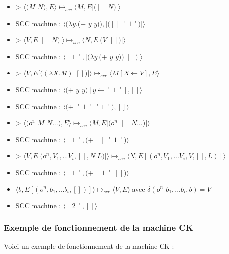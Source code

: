 \documentclass[10pt,a4paper]{article}
\begin{document}
\begin{itemize}
						\item[] > $\langle(M$ $N),E\rangle \longmapsto_{scc} \langle M,E[([]$ $N)]\rangle$
						\item[] SCC machine : $\langle(\lambda y.(+$ $y$ $y)),[([]$ $\ulcorner 1\urcorner)]\rangle$
						\item[] >  $\langle V,E[[]$ $N)]\rangle \longmapsto_{scc} \langle N,E[(V$ $[])]\rangle$
						\item[] SCC machine : $\langle\ulcorner 1\urcorner,[(\lambda y.(+$ $y$ $y))$ $[])]\rangle$
						\item[] > $\langle V,E[((\lambda X.M)$ $[])]\rangle \longmapsto_{scc} \langle M[X\leftarrow V],E\rangle$
						\item[] SCC machine : $\langle(+$ $y$ $y)[y \leftarrow \ulcorner 1\urcorner],[]\rangle$	
						\item[] SCC machine : $\langle(+$ $\ulcorner 1\urcorner$ $\ulcorner 1\urcorner),[]\rangle$	
						\item[] > $\langle(o^{n}$ $M$ $N...),E\rangle \longmapsto_{scc} \langle M,E[(o^{n}$ $[]$ $N...)]\rangle$
						\item[] SCC machine : $\langle\ulcorner 1\urcorner,(+$ $[]$ $\ulcorner 1\urcorner)\rangle$	
						\item[] > $\langle V,E[(o^{n},V_{1},...V_{i},[],N$ $L)]\rangle \longmapsto_{scc} \langle N,E[(o^{n},V_{1},...V_{i},V,[],L)]\rangle$
						\item[] SCC machine : $\langle\ulcorner 1\urcorner,(+$ $\ulcorner 1\urcorner$ $[])\rangle$	
						\item[] $\langle b,E[(o^{n},b_{1},...b_{i},[])]\rangle \longmapsto_{scc} \langle V,E\rangle$ avec $\delta (o^{n},b_{1},...b_{i},b)=V$ 
						\item[] SCC machine : $\langle\ulcorner 2\urcorner,[]\rangle$	
					\end{itemize}
				\newpage
				\subsubsection{Exemple de fonctionnement de la machine CK}\label{CK}
				
					Voici un exemple de fonctionnement de la machine CK :
					
\end{document}
